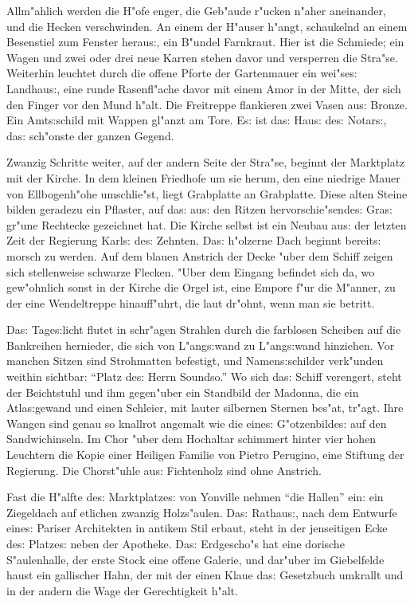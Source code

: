 \documentclass[oneside,12pt]{book}
\newcommand{\s}{s:}%
\begin{document}
Allm"ahlich werden die H"ofe enger, die Geb"aude r"ucken n"aher
aneinander, und die Hecken verschwinden. An einem der H"auser
h"angt, schaukelnd an einem Besenstiel zum Fenster herau{\s}, ein
B"undel Farnkraut. Hier ist die Schmiede; ein Wagen und zwei oder
drei neue Karren stehen davor und versperren die Stra"se.
Weiterhin leuchtet durch die offene Pforte der Gartenmauer ein
wei"se{\s} Landhau{\s}, eine runde Rasenfl"ache davor mit einem
Amor in der Mitte, der sich den Finger vor den Mund h"alt. Die
Freitreppe flankieren zwei Vasen au{\s} Bronze. Ein Amt{\s}schild
mit Wappen gl"anzt am Tore. E{\s} ist da{\s} Hau{\s} de{\s}
Notar{\s}, da{\s} sch"onste der ganzen Gegend.

Zwanzig Schritte weiter, auf der andern Seite der Stra"se, beginnt
der Marktplatz mit der Kirche. In dem kleinen Friedhofe um sie
herum, den eine niedrige Mauer von Ellbogenh"ohe umschlie"st,
liegt Grabplatte an Grabplatte. Diese alten Steine bilden geradezu
ein Pflaster, auf da{\s} au{\s} den Ritzen hervorschie"sende{\s}
Gra{\s} gr"une Rechtecke gezeichnet hat. Die Kirche selbst ist ein
Neubau au{\s} der letzten Zeit der Regierung Karl{\s} de{\s}
Zehnten. Da{\s} h"olzerne Dach beginnt bereit{\s} morsch zu
werden. Auf dem blauen Anstrich der Decke "uber dem Schiff zeigen
sich stellenweise schwarze Flecken. "Uber dem Eingang befindet
sich da, wo gew"ohnlich sonst in der Kirche die Orgel ist, eine
Empore f"ur die M"anner, zu der eine Wendeltreppe hinauff"uhrt,
die laut dr"ohnt, wenn man sie betritt.

Da{\s} Tage{\s}licht flutet in schr"agen Strahlen durch die
farblosen Scheiben auf die Bankreihen hernieder, die sich von
L"ang{\s}wand zu L"ang{\s}wand hinziehen. Vor manchen Sitzen sind
Strohmatten befestigt, und Namen{\s}schilder verk"unden weithin
sichtbar: "`Platz de{\s} Herrn Soundso."' Wo sich da{\s} Schiff
verengert, steht der Beichtstuhl und ihm gegen"uber ein Standbild
der Madonna, die ein Atla{\s}gewand und einen Schleier, mit lauter
silbernen Sternen bes"at, tr"agt. Ihre Wangen sind genau so
knallrot angemalt wie die eine{\s} G"otzenbilde{\s} auf den
Sandwichinseln. Im Chor "uber dem Hochaltar schimmert hinter vier
hohen Leuchtern die Kopie einer Heiligen Familie von Pietro
Perugino, eine Stiftung der Regierung. Die Chorst"uhle au{\s}
Fichtenholz sind ohne Anstrich.

Fast die H"alfte de{\s} Marktplatze{\s} von Yonville nehmen "`die
Hallen"' ein: ein Ziegeldach auf etlichen zwanzig Holzs"aulen.
Da{\s} Rathau{\s}, nach dem Entwurfe eine{\s} Pariser Architekten
in antikem Stil erbaut, steht in der jenseitigen Ecke de{\s}
Platze{\s} neben der Apotheke. Da{\s} Erdgescho"s hat eine
dorische S"aulenhalle, der erste Stock eine offene Galerie, und
dar"uber im Giebelfelde haust ein gallischer Hahn, der mit der
einen Klaue da{\s} Gesetzbuch umkrallt und in der andern die Wage
der Gerechtigkeit h"alt.
\end{document}
